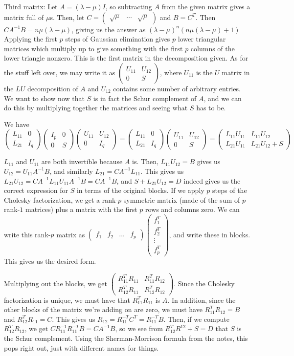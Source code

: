 \documentclass{article}
\newcommand{\openm}{\begin{pmatrix}}
\newcommand{\closem}{\end{pmatrix}}
\begin{document}
Third matrix: Let $A=(\lambda-\mu)I$, so subtracting $A$ from the given matrix gives a matrix full of $\mu$s. Then, let $C=\openm\sqrt{\mu}&\hdots&\sqrt{\mu}\closem$ and $B=C^T$. Then $CA^{-1}B=n\mu(\lambda-\mu)$, giving us the answer as $(\lambda-\mu)^n(n\mu(\lambda-\mu)+1)$
Applying the first $p$ steps of Gaussian elimination gives $p$ lower triangular matrices which multiply up to give something with the first $p$ columns of the lower triangle nonzero. This is the first matrix in the decomposition given. As for the stuff left over, we may write it as $\openm U_{11}&U_{12}\\0&S\closem$, where $U_{11}$ is the $U$ matrix in the $LU$ decomposition of $A$ and $U_{12}$ contains some number of arbitrary entries. We want to show now that $S$ is in fact the Schur complement of $A$, and we can do this by multiplying together the matrices and seeing what $S$ has to be.

We have 
\[\openm L_{11}&0\\L_{21}&I_q\closem\openm I_p&0\\0&S\closem\openm U_{11}&U_{12}\\0&I_q\closem=\openm L_{11}&0\\L_{21}&I_q\closem\openm U_{11}&U_{12}\\0&S\closem=\openm L_{11}U_{11}&L_{11}U_{12}\\L_{21}U_{11}&L_{21}U_{12}+S\closem\]

$L_{11}$ and $U_{11}$ are both invertible because $A$ is. Then, $L_{11}U_{12}=B$ gives us $U_{12}=U_{11}A^{-1}B$, and similarly $L_{21}=CA^{-1}L_{11}$. This gives us $L_{21}U_{12}=CA^{-1}L_{11}U_{11}A^{-1}B=CA^{-1}B$, and $S+L_{21}U_{12}=D$ indeed gives us the correct expression for $S$ in terms of the original blocks.
If we apply $p$ steps of the Cholesky factorization, we get a rank-$p$ symmetric matrix (made of the sum of $p$ rank-$1$ matrices) plus a matrix with the first $p$ rows and columns zero. We can write this rank-$p$ matrix as $\openm f_1&f_2&\hdots&f_p\closem\openm f_1^T\\f_2^T\\\vdots\\f_p^T\closem$, and write these in blocks. This gives us the desired form.

Multiplying out the blocks, we get $\openm R_{11}^TR_{11}&R_{11}^TR_{12}\\R_{12}^TR_{11}&R_{12}^TR_{12}\closem$. Since the Cholesky factorization is unique, we must have that $R_{11}^TR_{11}$ is $A$. In addition, since the other blocks of the matrix we're adding on are zero, we must have $R_{11}^TR_{12}=B$ and $R_{12}^TR_{11}=C$. This gives us $R_{12}=R_{11}^{-T}C^T=R_{11}^{-T}B$. Then, if we compute $R_{12}^TR_{12}$, we get $CR_{11}^{-1}R_{11}^{-T}B=CA^{-1}B$, so we see from $R_{12}^TR^{12}+S=D$ that $S$ is the Schur complement.
Using the Sherman-Morrison formula from the notes, this pops right out, just with different names for things.
\end{document}
